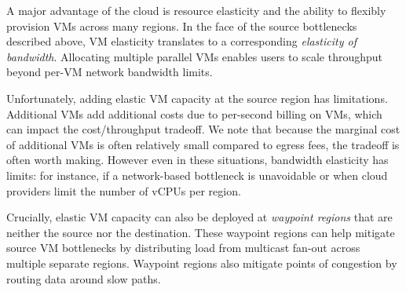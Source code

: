 % 
% 
A major advantage of the cloud is resource elasticity and the ability to flexibly provision VMs across many regions. 
% 
In the face of the source bottlenecks described above, VM elasticity translates to a corresponding \emph{elasticity of bandwidth}.
%
Allocating multiple parallel VMs enables users to scale throughput beyond per-VM network bandwidth limits.
%


Unfortunately, adding elastic VM capacity at the source region has limitations.
% 
Additional VMs add additional costs due to per-second billing on VMs, which can impact the cost/throughput tradeoff.
% 
We note that because the marginal cost of additional VMs is often relatively small compared to egress fees, the tradeoff is often worth making.
% 
However even in these situations, bandwidth elasticity has limits: for instance, if a network-based bottleneck is unavoidable or when cloud providers limit the number of vCPUs per region. 

Crucially, elastic VM capacity can also be deployed at \textit{waypoint regions} that are neither the source nor the destination.
% 
These waypoint regions can help mitigate source VM bottlenecks by distributing load from multicast fan-out across multiple separate regions.
% 
Waypoint regions also mitigate 
points of congestion 
by routing data around slow paths.
